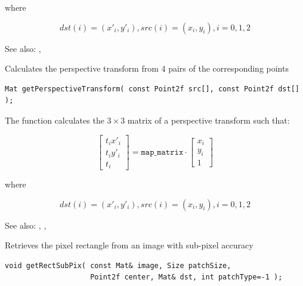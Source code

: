 where

\[
dst(i)=(x'_i,y'_i),
src(i)=(x_i, y_i),
i=0,1,2
\]

See also: , 

\label{getPerspectiveTransform}
Calculates the perspective transform from 4 pairs of the corresponding points

\begin{lstlisting}
Mat getPerspectiveTransform( const Point2f src[], const Point2f dst[] );
\end{lstlisting}

\begin{description}
\end{description}

The function calculates the $3 \times 3$ matrix of a perspective transform such that:

\[
\begin{bmatrix}
t_i x'_i\\
t_i y'_i\\
t_i
\end{bmatrix}
=
\texttt{map\_matrix}
\cdot
\begin{bmatrix}
x_i\\
y_i\\
1
\end{bmatrix}
\]

where

\[
dst(i)=(x'_i,y'_i),
src(i)=(x_i, y_i),
i=0,1,2
\]

See also: , , 

\label{getRectSubPix}
Retrieves the pixel rectangle from an image with sub-pixel accuracy

\begin{lstlisting}
void getRectSubPix( const Mat& image, Size patchSize,
                    Point2f center, Mat& dst, int patchType=-1 );
\end{lstlisting}
\begin{description}
\end{description}

